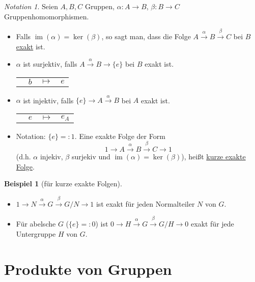 \documentclass[12pt]{scrartcl} %
\DeclareMathOperator{\im}{im}
\theoremstyle{definition}
\newtheorem{ex}{Beispiel}
\theoremstyle{remark}
\newtheorem*{notation}{Notation}
\begin{document}
\begin{notation}
	Seien $A, B, C$ Gruppen, $\alpha: A \rightarrow B$, $\beta: B \rightarrow C$ Gruppenhomomorphismen.
	\begin{itemize}
	\item Falls $\im(\alpha) = \ker(\beta)$, so sagt man, dass die Folge $A \stackrel{\alpha}{\longrightarrow} B \stackrel{\beta}{\longrightarrow} C$ bei $B$ \underline{exakt} ist.
	\item $\alpha$ ist surjektiv, falls $A \stackrel{\alpha}{\longrightarrow} B \longrightarrow \{e\}$ bei $B$ exakt ist. \\
		\begin{tabular}{p{4.3cm}p{.1cm}p{.3cm}l}
			& $b$ & $\mapsto$ & $e$
		\end{tabular}
	\item $\alpha$ ist injektiv, falls $\{e\} \longrightarrow A \stackrel{\alpha}{\longrightarrow} B$ bei $A$ exakt ist. \\
		\begin{tabular}{p{3.1cm}p{.1cm}p{.3cm}l}
			& $e$ & $\mapsto$ & $e_A$
		\end{tabular}
	\item Notation: $\{e\} =: 1$. Eine exakte Folge der Form
		$$ 1 \longrightarrow A \stackrel{\alpha}{\longrightarrow} B \stackrel{\beta}{\longrightarrow} C \longrightarrow 1$$
		(d.h. $\alpha$ injekiv, $\beta$ surjekiv und $\im(\alpha) = \ker(\beta)$), heißt \underline{kurze exakte Folge}.
	\end{itemize}
\end{notation}

\begin{ex}[für kurze exakte Folgen]
	\begin{itemize}
	\item $1 \longrightarrow N \stackrel{\alpha}{\longrightarrow} G \stackrel{\beta}{\longrightarrow} G/N \longrightarrow 1$ ist exakt für jeden Normalteiler $N$ von $G$.
	\item Für abelsche \(G\) ($\{e\} =: 0$) ist \(0 \longrightarrow H \stackrel{\alpha}{\longrightarrow} G \stackrel{\beta}{\longrightarrow} G/H \longrightarrow 0\) exakt für jede Untergruppe $H$ von $G$.
	\end{itemize}
\end{ex}

\section{Produkte von Gruppen}
\end{document}
